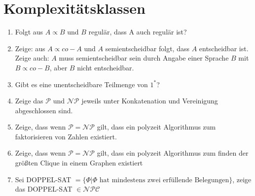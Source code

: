 \documentclass{article}
\begin{document}
\section{Komplexitätsklassen}
\begin{enumerate}
\item Folgt aus $A \propto B$ und $B$ regulär, dass A auch regulär ist? 
\item Zeige: aus $A \propto co-A$ und $A$ semientscheidbar folgt, dass $A$ entscheidbar ist. Zeige auch: $A$ muss semientscheidbar sein durch Angabe einer Sprache $B$ mit $B \propto co-B$, aber $B$ nicht entscheidbar.
\item Gibt es eine unentscheidbare Teilmenge von $1^*$?
\item Zeige das $\mathcal{P}$ und $\mathcal{NP}$ jeweils unter Konkatenation und Vereinigung abgeschlossen sind. 
\item Zeige, dass wenn $\mathcal{P} = \mathcal{NP}$ gilt, dass ein polyzeit Algorithmus zum faktorisieren von Zahlen existiert.
\item Zeige, dass wenn $\mathcal{P} = \mathcal{NP}$ gilt, dass ein polyzeit Algorithmus zum finden der größten Clique in einem Graphen existiert
\item Sei DOPPEL-SAT $= \{\Phi | \Phi\mbox{ hat mindestens zwei erfüllende Belegungen}\}$, zeige das DOPPEL-SAT $\in \mathcal{NPC}$
\end{enumerate}
\end{document}
